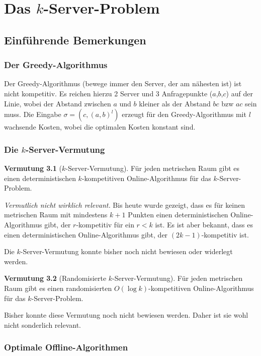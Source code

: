 \chapter{Das $k$-Server-Problem}


\section{Einführende Bemerkungen}

\subsection{Der Greedy-Algorithmus}

Der Greedy-Algorithmus (bewege immer den Server, der am nähesten ist) ist nicht kompetitiv. Es reichen hierzu 2 Server und 3 Anfragepunkte ($a$,$b$,$c$) auf der Linie, wobei der Abstand zwischen $a$ und $b$ kleiner als der Abstand $bc$ bzw $ac$ sein muss. Die Eingabe $\sigma = (c,(a,b)^l)$ erzeugt für den Greedy-Algorithmus mit $l$ wachsende Kosten, wobei die optimalen Kosten konstant sind.

\subsection{Die $k$-Server-Vermutung}

\textbf{Vermutung 3.1} ($k$-Server-Vermutung). Für jeden metrischen Raum gibt es einen deterministischen $k$-kompetitiven Online-Algorithmus für das $k$-Server-Problem.

\textit{Vermutlich nicht wirklich relevant.} Bis heute wurde gezeigt, dass es für keinen metrischen Raum mit mindestens $k+1$ Punkten einen deterministischen Online-Algorithmus gibt, der $r$-kompetitiv für ein $r < k$ ist. Es ist aber bekannt, dass es einen deterministischen Online-Algorithmus gibt, der $(2k-1)$-kompetitiv ist.

Die $k$-Server-Vermutung konnte bisher noch nicht bewiesen oder widerlegt werden.

\textbf{Vermutung 3.2} (Randomisierte $k$-Server-Vermutung). Für jeden metrischen Raum gibt es einen randomisierten $O(\log k)$-kompetitiven Online-Algorithmus für das $k$-Server-Problem.

Bisher konnte diese Vermutung noch nicht bewiesen werden. Daher ist sie wohl nicht sonderlich relevant.

\subsection{Optimale Offline-Algorithmen}


